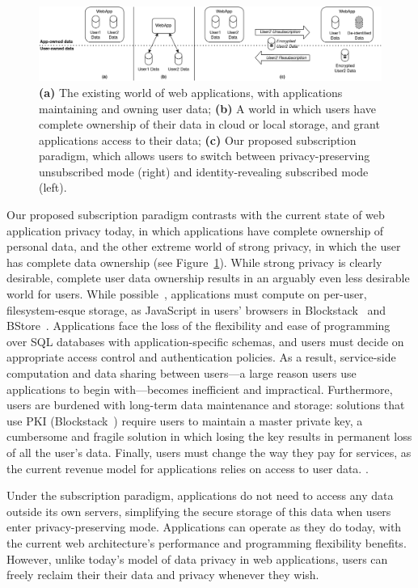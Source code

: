 \begin{figure}[ht!]
    \centering
    \includegraphics[width=\textwidth]{img/worlds}

    \caption{\textbf{(a)} The existing world of web applications, with applications maintaining and
    owning user data; \textbf{(b)} A world in which users have complete ownership of their data in cloud or local
    storage, and grant applications access to their data;
    \textbf{(c)} Our proposed subscription paradigm, which allows users to switch between privacy-preserving unsubscribed mode (right) and identity-revealing subscribed mode (left).}
    \label{fig:world}
\end{figure}


Our proposed subscription paradigm contrasts with the current state of web application privacy today,
in which applications have complete ownership of personal data, and the other extreme world of
strong privacy, in which the user has complete data ownership (see Figure~\ref{fig:world}).  While
strong privacy is clearly desirable, complete user data ownership results in an arguably even less
desirable world for users. While possible~\cite{amber, w5, blockstack, bstore}, applications
must compute on per-user, filesystem-esque storage, \eg as JavaScript in users' browsers in
Blockstack~\cite{blockstack} and BStore~\cite{bstore}. Applications face the loss of the flexibility
and ease of programming over SQL databases with application-specific schemas, and users must decide
on appropriate access control and authentication policies. As a result, service-side computation and
data sharing between users---a large reason users use applications to begin with---becomes
inefficient and impractical. 
%
Furthermore, users are burdened with long-term data maintenance and storage: solutions that use PKI
(\eg Blockstack~\cite{blockstack}) require users to maintain a
master private key, a cumbersome and fragile solution in which losing the key results in permanent
loss of all the user's data.
%
Finally, users must change the way they pay for services, as the current revenue model for
applications relies on access to user data. 
.

Under the subscription paradigm, applications do not need to access any data outside its own
servers, simplifying the secure storage of this data when users enter privacy-preserving mode.
Applications can operate as they do today, with the current web architecture's performance and
programming flexibility benefits. However, unlike today's model of data privacy in web applications, users can freely reclaim their 
their data and privacy whenever they wish.
